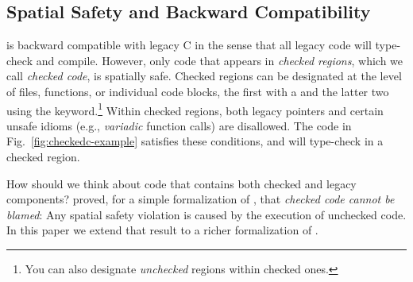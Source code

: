 \subsection{Spatial Safety and Backward Compatibility}
%
\checkedc is backward compatible with legacy C in the sense that all
legacy code will type-check and compile. However, only code that
appears in \emph{checked regions}, which we call \emph{checked code},
is spatially safe. Checked regions can be designated at the level of
files, functions, or individual code blocks, the first with a
 and the latter two using the 
keyword.\footnote{You can also designate \emph{unchecked} regions
  within checked ones.}  Within checked regions, both
legacy pointers and certain unsafe idioms (e.g., \emph{variadic} function
calls) are disallowed. The code in Fig.~\ref{fig:checkedc-example}
satisfies these conditions, and will type-check in a checked region.

How should we think about code that contains both checked and legacy
components? \citet{ruef18checkedc-incr} proved, for a simple
formalization of \checkedc, that \emph{checked code cannot be blamed}:
Any spatial safety violation is caused by the execution of unchecked
code. In this paper we extend that result to a richer formalization of
\checkedc. 

  

